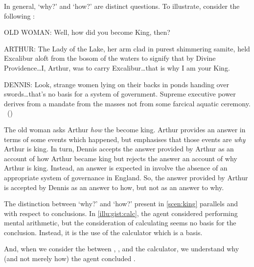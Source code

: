\begin{note}
  In general, `why?' and `how?' are distinct questions.
  To illustrate, consider the following \scen{}:

  \begin{scenario}[England AD 932]
    \label{scen:king}
    \vspace{-\baselineskip}
    \begin{screenplay}
    \item[OLD WOMAN:]
      Well, how did you become King, then?
    \item[ARTHUR:]
      The Lady of the Lake, her arm clad in purest shimmering samite, held Excalibur aloft from the bosom of the waters to signify that by Divine Providence\space\dots\space I, Arthur, was to carry Excalibur\dots\space that is why I am your King.
    \item[DENNIS:]
      Look, strange women lying on their backs in ponds handing over swords\space\dots\space that's no basis for a system of government.
      Supreme executive power derives from a mandate from the masses not from some farcical aquatic ceremony.\newline
      \mbox{ }\hfill\mbox{(\cite[8--9]{Cleese:1974aa})}
    \end{screenplay}
    \vspace{-\baselineskip}
  \end{scenario}

  The old woman asks Arthur \emph{how} the become king.
  Arthur provides an answer in terms of some events which happened, but emphasises that those events are \emph{why} Arthur is king.
  In turn, Dennis accepts the answer provided by Arthur as an account of how Arthur became king but rejects the answer an account of why Arthur is king.
  Instead, an answer is expected in involve the absence of an appropriate system of governance in England.
  So, the answer provided by Arthur is accepted by Dennis as an answer to how, but not as an answer to why.

  The distinction between `why?' and `how?' present in \autoref{scen:king} parallels \qWhy{} and \qHow{} with respect to conclusions.
  In \autoref{illu:gist:calc}, the agent considered performing mental arithmetic, but the consideration of calculating \gistCalcEq{} seems no basis for the conclusion.
  Instead, it is the use of the calculator which is a basis.

  And, when we consider the \ros{} between \propM{\gistCalcEq{}}, , and the calculator, we understand why (and not merely how) the agent concluded \gistCalcEq{}.
\end{note}

